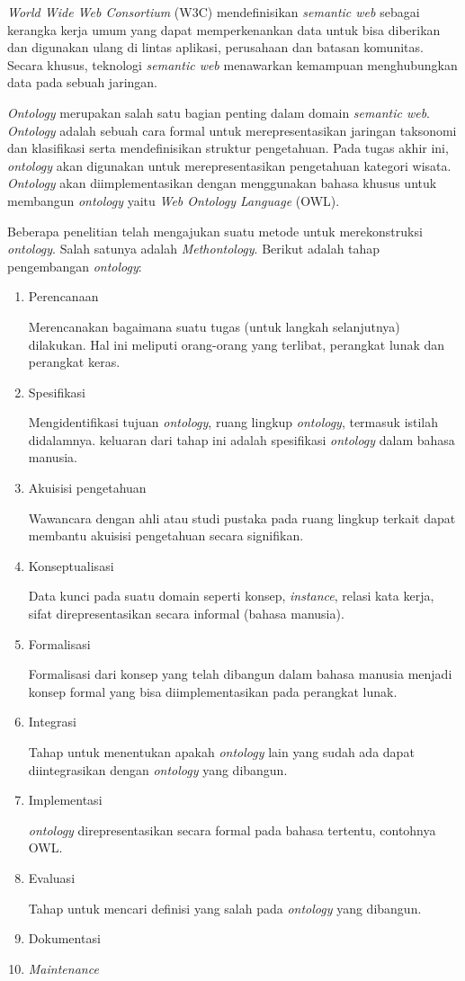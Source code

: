 \textit{World Wide Web Consortium} (W3C) mendefinisikan \textit{semantic web} sebagai kerangka kerja umum yang dapat memperkenankan data untuk bisa diberikan dan digunakan ulang di lintas aplikasi, perusahaan dan batasan komunitas. Secara khusus, teknologi \textit{semantic web} menawarkan kemampuan menghubungkan data pada sebuah jaringan.
\par
\textit{Ontology} merupakan salah satu bagian penting dalam domain \textit{semantic web}. \textit{Ontology} adalah sebuah cara formal untuk merepresentasikan jaringan taksonomi dan klasifikasi serta mendefinisikan struktur pengetahuan. Pada tugas akhir ini, \textit{ontology} akan digunakan untuk merepresentasikan pengetahuan kategori wisata. \textit{Ontology} akan diimplementasikan dengan menggunakan bahasa khusus untuk membangun \textit{ontology} yaitu \textit{Web Ontology Language} (OWL).
\par
Beberapa penelitian telah mengajukan suatu metode untuk merekonstruksi \textit{ontology}. Salah satunya adalah \textit{Methontology}\cite{jones1998methodologies}. 
Berikut adalah tahap pengembangan \textit{ontology}\cite{fernandez1997methontology}:
\begin{enumerate}
	\item Perencanaan 
		\par Merencanakan bagaimana suatu tugas (untuk langkah selanjutnya) dilakukan. Hal ini meliputi orang-orang yang terlibat, perangkat lunak dan perangkat keras.
	\item Spesifikasi 
		\par Mengidentifikasi tujuan \textit{ontology}, ruang lingkup \textit{ontology}, termasuk istilah didalamnya. keluaran dari tahap ini adalah spesifikasi \textit{ontology} dalam bahasa manusia.
	\item Akuisisi pengetahuan 
		\par Wawancara dengan ahli atau studi pustaka pada ruang lingkup terkait dapat membantu akuisisi pengetahuan secara signifikan.
	\item Konseptualisasi  
		\par Data kunci pada suatu domain seperti konsep, \textit{instance}, relasi kata kerja, sifat direpresentasikan secara informal (bahasa manusia).
	\item Formalisasi
		\par Formalisasi dari konsep yang telah dibangun dalam bahasa manusia menjadi konsep formal yang bisa diimplementasikan pada perangkat lunak.
	\item Integrasi 
		\par Tahap untuk menentukan apakah \textit{ontology} lain yang sudah ada dapat diintegrasikan dengan \textit{ontology} yang dibangun.
	\item Implementasi 
		\par \textit{ontology} direpresentasikan secara formal pada bahasa tertentu, contohnya OWL. 
	\item Evaluasi 
		\par Tahap untuk mencari definisi yang salah pada \textit{ontology} yang dibangun.
	\item Dokumentasi
	\item \textit{Maintenance}
\end{enumerate}


